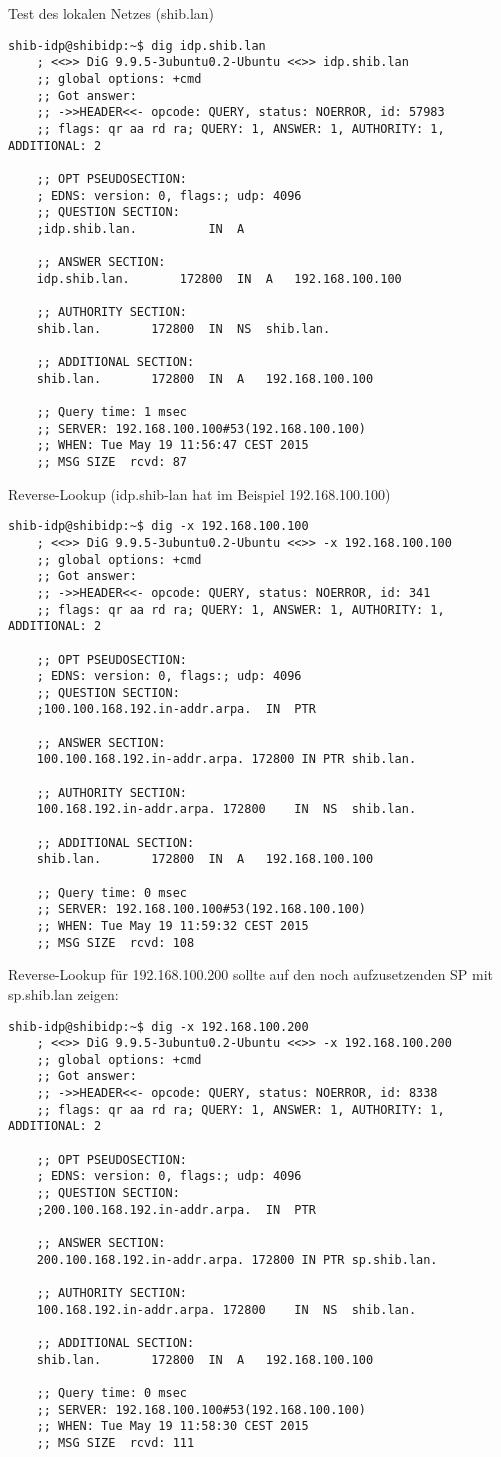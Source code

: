 Test des lokalen Netzes (shib.lan)
\begin{lstlisting}
shib-idp@shibidp:~$ dig idp.shib.lan
	; <<>> DiG 9.9.5-3ubuntu0.2-Ubuntu <<>> idp.shib.lan
	;; global options: +cmd
	;; Got answer:
	;; ->>HEADER<<- opcode: QUERY, status: NOERROR, id: 57983
	;; flags: qr aa rd ra; QUERY: 1, ANSWER: 1, AUTHORITY: 1, ADDITIONAL: 2

	;; OPT PSEUDOSECTION:
	; EDNS: version: 0, flags:; udp: 4096
	;; QUESTION SECTION:
	;idp.shib.lan.			IN	A

	;; ANSWER SECTION:
	idp.shib.lan.		172800	IN	A	192.168.100.100

	;; AUTHORITY SECTION:
	shib.lan.		172800	IN	NS	shib.lan.

	;; ADDITIONAL SECTION:
	shib.lan.		172800	IN	A	192.168.100.100

	;; Query time: 1 msec
	;; SERVER: 192.168.100.100#53(192.168.100.100)
	;; WHEN: Tue May 19 11:56:47 CEST 2015
	;; MSG SIZE  rcvd: 87
\end{lstlisting}				
Reverse-Lookup (idp.shib-lan hat im Beispiel 192.168.100.100)
\begin{lstlisting}
shib-idp@shibidp:~$ dig -x 192.168.100.100
	; <<>> DiG 9.9.5-3ubuntu0.2-Ubuntu <<>> -x 192.168.100.100
	;; global options: +cmd
	;; Got answer:
	;; ->>HEADER<<- opcode: QUERY, status: NOERROR, id: 341
	;; flags: qr aa rd ra; QUERY: 1, ANSWER: 1, AUTHORITY: 1, ADDITIONAL: 2

	;; OPT PSEUDOSECTION:
	; EDNS: version: 0, flags:; udp: 4096
	;; QUESTION SECTION:
	;100.100.168.192.in-addr.arpa.	IN	PTR

	;; ANSWER SECTION:
	100.100.168.192.in-addr.arpa. 172800 IN	PTR	shib.lan.

	;; AUTHORITY SECTION:
	100.168.192.in-addr.arpa. 172800	IN	NS	shib.lan.

	;; ADDITIONAL SECTION:
	shib.lan.		172800	IN	A	192.168.100.100

	;; Query time: 0 msec
	;; SERVER: 192.168.100.100#53(192.168.100.100)
	;; WHEN: Tue May 19 11:59:32 CEST 2015
	;; MSG SIZE  rcvd: 108
\end{lstlisting}
Reverse-Lookup für 192.168.100.200 sollte auf den noch aufzusetzenden SP mit sp.shib.lan zeigen: 
\begin{lstlisting}
shib-idp@shibidp:~$ dig -x 192.168.100.200
	; <<>> DiG 9.9.5-3ubuntu0.2-Ubuntu <<>> -x 192.168.100.200
	;; global options: +cmd
	;; Got answer:
	;; ->>HEADER<<- opcode: QUERY, status: NOERROR, id: 8338
	;; flags: qr aa rd ra; QUERY: 1, ANSWER: 1, AUTHORITY: 1, ADDITIONAL: 2

	;; OPT PSEUDOSECTION:
	; EDNS: version: 0, flags:; udp: 4096
	;; QUESTION SECTION:
	;200.100.168.192.in-addr.arpa.	IN	PTR

	;; ANSWER SECTION:
	200.100.168.192.in-addr.arpa. 172800 IN	PTR	sp.shib.lan.

	;; AUTHORITY SECTION:
	100.168.192.in-addr.arpa. 172800	IN	NS	shib.lan.

	;; ADDITIONAL SECTION:
	shib.lan.		172800	IN	A	192.168.100.100

	;; Query time: 0 msec
	;; SERVER: 192.168.100.100#53(192.168.100.100)
	;; WHEN: Tue May 19 11:58:30 CEST 2015
	;; MSG SIZE  rcvd: 111
\end{lstlisting}

